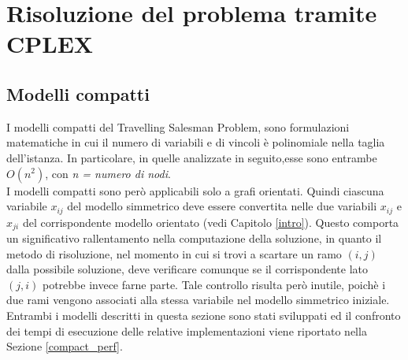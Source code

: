\chapter{Risoluzione del problema tramite CPLEX}\label{CPLEX} 
\section{Modelli compatti}
I modelli compatti del Travelling Salesman Problem, sono formulazioni matematiche in cui il numero di variabili e di vincoli è polinomiale nella taglia dell'istanza. In particolare, in quelle analizzate in seguito,esse sono entrambe $O(n^2)$, con \textit{n = numero di nodi}.\\
I modelli compatti sono però applicabili solo a grafi orientati. Quindi ciascuna variabile $x_{ij}$ del modello simmetrico deve essere convertita nelle due variabili $x_{ij}$ e $x_{ji}$ del corrispondente modello orientato (vedi Capitolo \ref{intro}). Questo comporta un significativo rallentamento nella computazione della soluzione, in quanto il metodo di risoluzione, nel momento in cui si trovi a scartare un ramo $(i,j)$ dalla possibile soluzione, deve verificare comunque se il corrispondente lato $(j,i)$ potrebbe invece farne parte. Tale controllo risulta però inutile, poichè i due rami vengono associati alla stessa variabile nel modello simmetrico iniziale.
Entrambi i modelli descritti in questa sezione sono stati sviluppati ed il confronto dei tempi di esecuzione delle relative implementazioni viene riportato nella Sezione \ref{compact_perf}.
